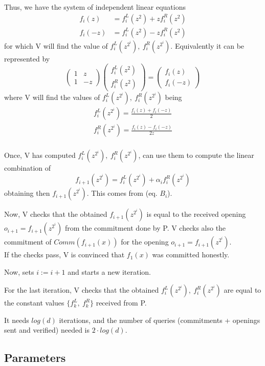 \documentclass{article}
\theoremstyle{definition}
\begin{document}
Thus, we have the system of independent linear equations
\begin{align*} %
	f_i(z)&=f_i^L(z^2) + z f_i^R(z^2)\\
	f_i(-z)&=f_i^L(z^2) - z f_i^R(z^2)
\end{align*}
for which V will find the value of $f_i^L(z^{2^i}),~f_i^R(z^{2^i})$.
Equivalently it can be represented by
$$
\begin{pmatrix}
	1 & z\\
	1 & -z
\end{pmatrix}
\begin{pmatrix}
	f_i^L(z^2)\\
	f_i^R(z^2)
\end{pmatrix}
=
\begin{pmatrix}
	f_i(z)\\
	f_i(-z)
\end{pmatrix}
$$
where V will find the values of $f_i^L(z^{2^i}),~f_i^R(z^{2^i})$ being
\begin{align*}
	f_i^L(z^{2^i})=\frac{f_i(z) + f_i(-z)}{2}\\
	f_i^R(z^{2^i})=\frac{f_i(z) - f_i(-z)}{2z}\\
\end{align*}

Once, V has computed $f_i^L(z^{2^i}),~f_i^R(z^{2^i})$, can use them to compute the linear combination of
$$
f_{i+1}(z^{2^i}) = f_i^L(z^{2^i}) + \alpha_i f_i^R(z^{2^i})
$$
obtaining then $f_{i+1}(z^{2^i})$. This comes from (eq. $B_i$).

Now, V checks that the obtained $f_{i+1}(z^{2^i})$ is equal to the received opening $o_{i+1}=f_{i+1}(z^{2^i})$ from the commitment done by P.
V checks also the commitment of $Comm(f_{i+1}(x))$ for the opening $o_{i+1}=f_{i+1}(z^{2^i})$.\\
If the checks pass, V is convinced that $f_1(x)$ was committed honestly.

Now, sets $i := i+1$ and starts a new iteration.

For the last iteration, V checks that the obtained $f_i^L(z^{2^i}),~f_i^R(z^{2^i})$ are equal to the constant values $\{f_k^L,~f_k^R\}$ received from P.

\vspace{10px}
It needs $log(d)$ iterations, and the number of queries (commitments + openings sent and verified) needed is $2 \cdot log(d)$.

\subsection{Parameters}
\end{document}

